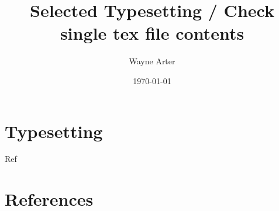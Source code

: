 \documentclass[a4paper,12pt]{article}
\begin{document}

\title{Selected Typesetting / Check single tex file contents}
\author{Wayne Arter}
\date{\today}



\maketitle

\section{Typesetting}\label{sec:contents}
Ref~\cite{Ri21Polo}
%
%
%
%
%
%
%
%

\section*{References}



\end{document}
